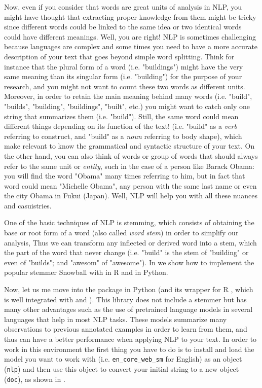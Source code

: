 Now, even if you consider that words are great units of analysis in NLP, you might have thought that extracting proper knowledge from them might be tricky since different words could be linked to the same idea or two identical words could have different meanings. Well, you are right! NLP is sometimes challenging because languages are complex and some times you need to have a more accurate description of your text that goes beyond simple word splitting. Think for instance that the plural form of a word (i.e. "buildings") might have the very same meaning than its singular form (i.e. "building") for the purpose of your research, and you might not want to count these two words as different units. Moreover, in order to retain the main meaning behind many words (i.e. "build", "builds", "building", "buildings", "built", etc.) you might want to catch only one string that summarizes them (i.e. "build"). Still, the same word could mean different things depending on its function of the text! (i.e. "build" as a \textit{verb} referring to construct, and "build" as a \textit{noun} referring to body shape), which make relevant to know the grammatical and syntactic structure of your text. On the other hand, you can also think of words or group of words that should always refer to the same unit or \textit{entity}, such in the case of a person like Barack Obama: you will find the word "Obama" many times referring to him, but in fact that word could mean "Michelle Obama", any person with the same last name or even the city Obama in Fukui (Japan). Well, NLP will help you with all these nuances and casuistries. 

One of the basic techniques of NLP is stemming, which consists of obtaining the base or root form of a word (also called \textit{word stem}) in order to simplify our analysis, Thus we can transform any inflected or derived word into a stem, which the part of the word that never change (i.e. "build" is the stem of "building" or even of "builds"; and "awesom" of "awesome"). In  we show how to implement the popular stemmer Snowball with  in R and  in Python.


Now, let us me move into the package  in Python (and its wrapper for R , which is well integrated with  and ). This library does not include a stemmer but has many other advantages such as the use of pretrained language models in several languages that help in most NLP tasks. These models summarize many observations to previous annotated examples in order to learn from them, and thus can have a better performance when applying NLP to your text. In order to work in this environment the first thing you have to do is to install and load the model you want to work with (i.e. \verb|en_core_web_sm| for English) as an object (\verb|nlp|) and then use this object to convert your initial string to a new  object (\verb|doc|), as shown in .

